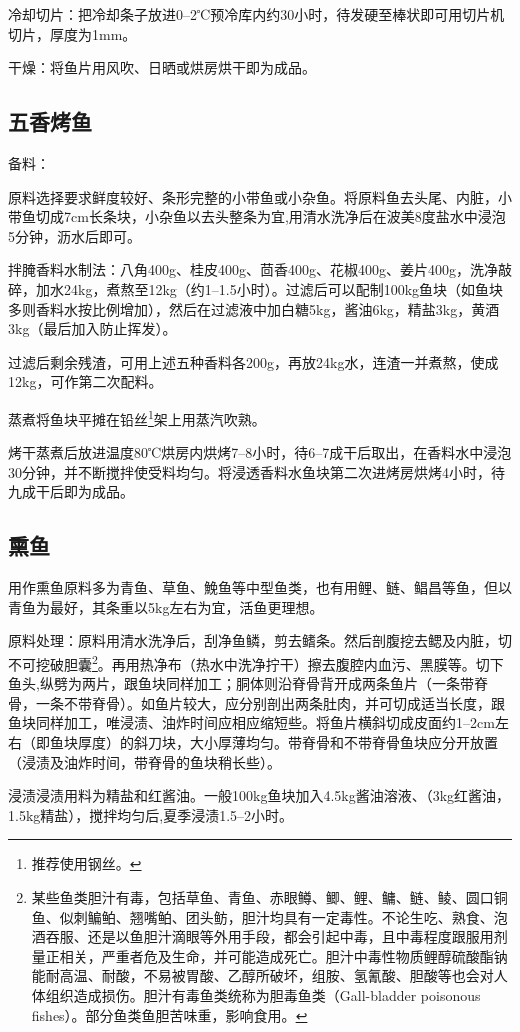 \documentclass{ctexbook}
\begin{document}
冷却切片：把冷却条子放进0--2℃预冷库内约30小时，待发硬至棒状即可用切片机切片，厚度为1mm。

干燥：将鱼片用风吹、日晒或烘房烘干即为成品。
\subsection{五香烤鱼}
备料：

原料选择要求鲜度较好、条形完整的小带鱼或小杂鱼。将原料鱼去头尾、内脏，小带鱼切成7cm长条块，小杂鱼以去头整条为宜,用清水洗净后在波美8度盐水中浸泡5分钟，沥水后即可。

拌腌香料水制法：八角400g、桂皮400g、茴香400g、花椒400g、姜片400g，洗净敲碎，加水24kg，煮熬至12kg（约1--1.5小时）。过滤后可以配制100kg鱼块（如鱼块多则香料水按比例增加），然后在过滤液中加白糖5kg，酱油6kg，精盐3kg，黄酒3kg（最后加入防止挥发）。

过滤后剩余残渣，可用上述五种香料各200g，再放24kg水，连渣一并煮熬，使成12kg，可作第二次配料。

蒸煮将鱼块平摊在铅丝\footnote{推荐使用钢丝。}架上用蒸汽吹熟。

烤干蒸煮后放进温度80℃烘房内烘烤7--8小时，待6--7成干后取出，在香料水中浸泡30分钟，并不断搅拌使受料均匀。将浸透香料水鱼块第二次进烤房烘烤4小时，待九成干后即为成品。
\subsection{熏鱼}
用作熏鱼原料多为青鱼、草鱼、鮸鱼等中型鱼类，也有用鲤、鲢、鲳昌等鱼，但以青鱼为最好，其条重以5kg左右为宜，活鱼更理想。

原料处理：原料用清水洗净后，刮净鱼鳞，剪去鳍条。然后剖腹挖去鳃及内脏，切不可挖破胆囊\footnote{某些鱼类胆汁有毒，包括草鱼、青鱼、赤眼鳟、鲫、鲤、鳙、鲢、鲮、圆口铜鱼、似刺鳊鲌、翘嘴鲌、团头鲂，胆汁均具有一定毒性。不论生吃、熟食、泡酒吞服、还是以鱼胆汁滴眼等外用手段，都会引起中毒，且中毒程度跟服用剂量正相关，严重者危及生命，并可能造成死亡。胆汁中毒性物质鲤醇硫酸酯钠能耐高温、耐酸，不易被胃酸、乙醇所破坏，组胺、氢氰酸、胆酸等也会对人体组织造成损伤。胆汁有毒鱼类统称为胆毒鱼类（Gall-bladder poisonous fishes）。部分鱼类鱼胆苦味重，影响食用。}。再用热净布（热水中洗净拧干）擦去腹腔内血污、黑膜等。切下鱼头,纵劈为两片，跟鱼块同样加工；胴体则沿脊骨背开成两条鱼片（一条带脊骨，一条不带脊骨）。如鱼片较大，应分别剖出两条肚肉，并可切成适当长度，跟鱼块同样加工，唯浸渍、油炸时间应相应缩短些。将鱼片横斜切成皮面约1--2cm左右（即鱼块厚度）的斜刀块，大小厚薄均匀。带脊骨和不带脊骨鱼块应分开放置（浸渍及油炸时间，带脊骨的鱼块稍长些）。

浸渍浸渍用料为精盐和红酱油。一般100kg鱼块加入4.5kg酱油溶液、（3kg红酱油，1.5kg精盐），搅拌均匀后,夏季浸渍1.5--2小时。
\end{document}
